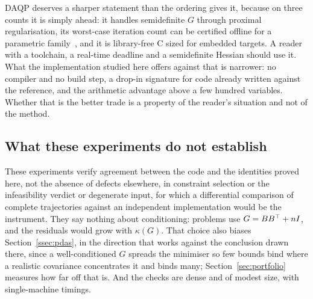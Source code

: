 DAQP deserves a sharper statement than the ordering gives it, because on three
counts it is simply ahead: it handles semidefinite $G$ through proximal
regularisation, its worst-case iteration count can be certified offline for a
parametric family~\cite{arnstrom2022certification}, and it is library-free C sized
for embedded targets. A reader with a toolchain, a real-time deadline and a
semidefinite Hessian should use it. What the implementation studied here offers
against that is narrower: no compiler and no build step, a
drop-in signature for code already written against the reference, and the arithmetic
advantage above a few hundred variables. Whether that is the better trade is a
property of the reader's situation and not of the method.

\subsection{What these experiments do not establish}
\label{ssec:limits}

These experiments verify agreement between the code and the identities proved
here, not the absence of defects elsewhere, in constraint selection or the
infeasibility verdict or degenerate input, for which a differential comparison
of complete trajectories against an independent implementation would be the
instrument. They say nothing about conditioning: problems use
$G = BB^{\top} + nI$, and the residuals would grow with $\kappa(G)$. That choice also
biases Section~\ref{ssec:pdas}, in the direction that works against the conclusion
drawn there, since a well-conditioned $G$ spreads the minimiser so few bounds bind
where a realistic covariance concentrates it and binds many;
Section~\ref{sec:portfolio} measures how far off that is. And the checks are dense
and of modest size, with single-machine timings.
